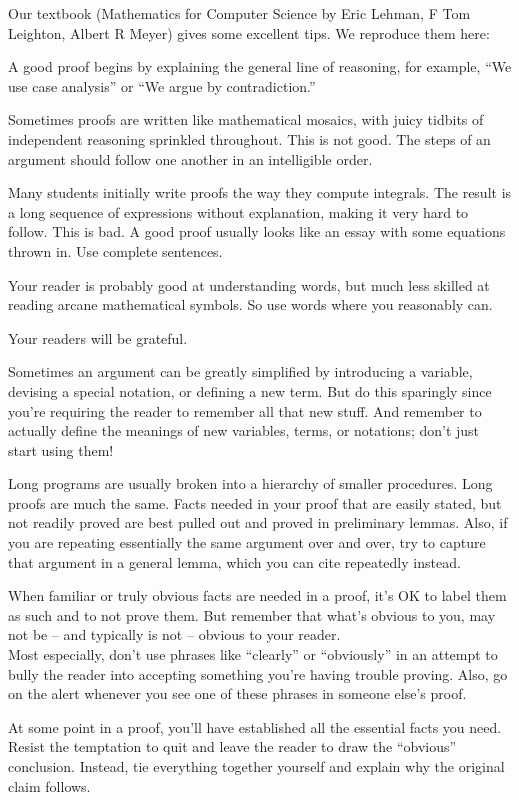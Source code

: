 \documentclass[12pt,letterpaper]{article}
\begin{document}
Our textbook (Mathematics for Computer Science by Eric Lehman, F Tom Leighton, Albert R Meyer) gives some excellent tips. We reproduce them here:
\begin{description}
  \itemsep-1pt
  \item[State your game plan.] A good proof begins by explaining the general line of reasoning, for example, ``We use case analysis'' or ``We argue by contradiction.''
  \item[Keep a linear flow.] Sometimes proofs are written like mathematical mosaics, with juicy tidbits of independent reasoning sprinkled throughout. This is not good. The steps of an argument should follow one another in an intelligible order.
  \item[A proof is an essay, not a calculation.] Many students initially write proofs the way they compute integrals. The result is a long sequence of expressions without explanation, making it very hard to follow. This is bad. A good proof usually looks like an essay with some equations thrown in. Use complete sentences.
  \item[Avoid excessive symbolism.] Your reader is probably good at understanding words, but much less skilled at reading arcane mathematical symbols. So use words where you reasonably can.
  \item[Revise and simplify.] Your readers will be grateful.
  \item[Introduce notation thoughtfully.] Sometimes an argument can be greatly simplified by introducing a variable, devising a special notation, or defining a new term. But do this sparingly since you're requiring the reader to remember all that new stuff. And remember to actually define the meanings of new variables, terms, or notations; don't just start using them!
  \item[Structure long proofs.] Long programs are usually broken into a hierarchy of smaller procedures. Long proofs are much the same. Facts needed in your proof that are easily stated, but not readily proved are best pulled out and proved in preliminary lemmas. Also, if you are repeating essentially the same argument over and over, try to capture that argument in a general lemma, which you can cite repeatedly instead.
  \item[Be wary of the ``obvious.''] When familiar or truly obvious facts are needed in a proof, it's OK to label them as such and to not prove them. But remember that what's obvious to you, may not be -- and typically is not -- obvious to your reader.\\
    Most especially, don't use phrases like ``clearly'' or ``obviously'' in an attempt to bully the reader into accepting something you're having trouble proving. Also, go on the alert whenever you see one of these phrases in someone else's proof.
  \item[Finish.] At some point in a proof, you'll have established all the essential facts you need. Resist the temptation to quit and leave the reader to draw the ``obvious'' conclusion. Instead, tie everything together yourself and explain why the original claim follows.
\end{description}
\end{document}
